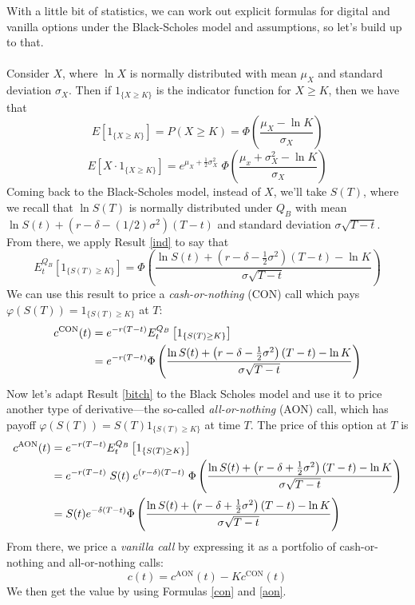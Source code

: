 \documentclass[12pt]{article}
\theoremstyle{plain}
\theoremstyle{definition}
\theoremstyle{remark}
\begin{document}
With a little bit of statistics, we can work out explicit formulas
for digital and vanilla options under the Black-Scholes model and 
assumptions, so let's build up to that.
\\
\\
Consider $X$, where $\ln X$ is normally distributed with mean $\mu_X$
and standard deviation $\sigma_X$.  Then if $1_{\{X\geq K\}}$ is the
indicator function for $X \geq K$, then we have that
\begin{equation}
   \label{ind}
   E\left[1_{\{X\geq K\}}\right] = P(X\geq K) = \Phi \left(
      \frac{\mu_X - \ln K }{\sigma_X}\right) 
\end{equation}
\begin{equation}
   \label{bitch}
    E\left[X \cdot 1_{\{X\geq K\}}\right] = 
      e^{\mu_X + \frac{1}{2}\sigma_X^2} \; \Phi\left(\frac{\mu_x + 
      \sigma_X^2 - \ln K}{\sigma_X} \right) 
\end{equation}
Coming back to the Black-Scholes model, instead of $X$, we'll take
$S(T)$, where we recall that $\ln S(T)$ is normally distributed under 
$Q_B$ with mean
$\ln S(t) + ( r - \delta - (1/2)\sigma^2) (T-t)$
and standard deviation $\sigma \sqrt{T-t}$. From there, we apply
Result \ref{ind} to say that
   \[ E_t^{Q_B}\left[ 1_{\{S(T)\geq K\}}\right] = 
      \Phi\left( \frac{\ln S(t) + \left(r-\delta - \frac{1}{2} \sigma^2
      \right)(T-t) - \ln K }{\sigma \sqrt{T-t}}\right) \]
We can use this result to price a \emph{cash-or-nothing} (CON) call
which pays $\varphi(S(T)) = 1_{\{S(T)\geq K\}}$ at $T$:
\begin{align}
   \label{con}
   c^{\text{CON}}(t) &= e^{-r(T-t)} 
      E_t^{Q_B}\left[ 1_{\{S(T)\geq K\}}\right]
   \notag\\
   &=  e^{-r(T-t)} 
      \Phi\left( \frac{\ln S(t) + \left(r-\delta - \frac{1}{2} \sigma^2
      \right)(T-t) - \ln K }{\sigma \sqrt{T-t}}\right) 
\end{align}
Now let's adapt Result \ref{bitch} to the Black Scholes model and use
it to price another type of derivative---the so-called 
\emph{all-or-nothing} (AON) call, which has payoff $\varphi(S(T)) = 
S(T) 1_{\{S(T) \geq K\}}$ at time $T$. The price of this option at
$T$ is 
\begin{align}
   \label{aon}
      c^{\text{AON}}(t) &= e^{-r(T-t)} 
      E_t^{Q_B}\left[ 1_{\{S(T)\geq K\}}\right]
      \notag\\
      &= e^{-r(T-t)}  \; S(t) \; e^{(r-\delta)(T-t)} \;
      \Phi\left(\frac{\ln S(t) + \left(r-\delta + \frac{1}{2}\sigma^2
      \right)(T-t) - \ln K}{\sigma \sqrt{T-t}}\right)
      \notag\\
      &= S(t) e^{-\delta (T-t)} \Phi\left(\frac{\ln S(t) + 
	 \left(r-\delta + \frac{1}{2}\sigma^2
	 \right)(T-t) - \ln K}{\sigma \sqrt{T-t}}\right)
\end{align}
From there, we price a \emph{vanilla call} by expressing it as a
portfolio of cash-or-nothing and all-or-nothing calls:
   \[ c(t) = c^{\text{AON}}(t) - K  c^{\text{CON}}(t) \]
We then get the value by using Formulas \ref{con} and \ref{aon}.
\end{document}
